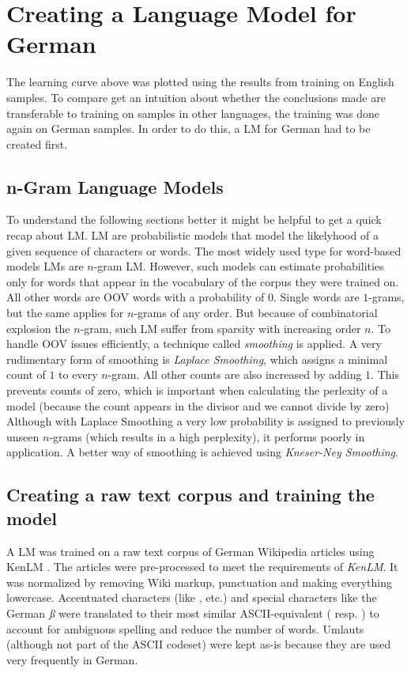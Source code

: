 \section{Creating a Language Model for German}\label{lm}

The learning curve above was plotted using the results from training on English samples. To compare get an intuition about whether the conclusions made are transferable to training on samples in other languages, the training was done again on German samples. In order to do this, a \ac{LM} for German had to be created first.

\subsection{n-Gram Language Models}

To understand the following sections better it might be helpful to get a quick recap about \ac{LM}. \ac{LM} are probabilistic models that model the likelyhood of a given sequence of characters or words. The most widely used type for word-based models \ac{LM}s are $n$-gram \ac{LM}. However, such models can estimate probabilities only for words that appear in the vocabulary of the corpus they were trained on. All other words are \ac{OOV} words with a probability of $0$. Single words are $1$-grams, but the same applies for $n$-grams of any order. But because of combinatorial explosion the $n$-gram, such \ac{LM} suffer from sparsity with increasing order $n$. To handle \ac{OOV} issues efficiently, a technique called \textit{smoothing} is applied. A very rudimentary form of smoothing is \textit{Laplace Smoothing}, which assigns a minimal count of $1$ to every $n$-gram. All other counts are also increased by adding $1$. This prevents counts of zero, which is important when calculating the perlexity of a model (because the count appears in the divisor and we cannot divide by zero) Although with Laplace Smoothing a very low probability is assigned to previously unseen $n$-grams (which results in a high perplexity), it performs poorly in application. A better way of smoothing is achieved using \textit{Kneser-Ney Smoothing}.

\subsection{Creating a raw text corpus and training the model}

A LM was trained on a raw text corpus of German Wikipedia articles using KenLM \parencite{kenlm}. The articles were pre-processed to meet the requirements of \textit{KenLM}.
It was normalized by removing Wiki markup, punctuation and making everything lowercase. Accentuated characters (like , etc.) and special characters like the German \textit{ß} were translated to their most similar ASCII-equivalent ( resp. ) to account for ambiguous spelling and reduce the number of words. Umlauts (although not part of the ASCII codeset) were kept as-is because they are used very frequently in German.

